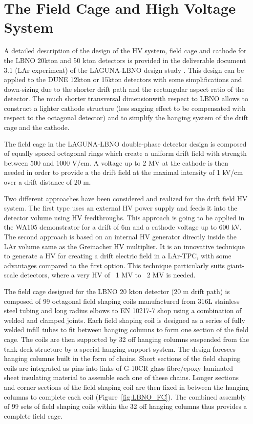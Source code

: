 \section{The Field Cage and High Voltage System} 
\label{sec:detectors-fd-alt-hv}

A detailed description of the design of the HV system, field cage and cathode for the LBNO 20kton and 50 kton detectors is provided in the deliverable document 3.1 (LAr experiment) of the LAGUNA-LBNO design study \cite{LAGUNA-LBNO-deliv}. This design can be applied to the DUNE 12kton or 15kton detectors with some simplifications and down-sizing due to the shorter drift path and the rectangular aspect ratio of the detector. The much shorter transversal dimensionwith respect to LBNO allows to construct a lighter cathode structure (less sagging effect to be compensated with respect to the octagonal detector) and to simplify the hanging system of the drift cage and the cathode.

The field cage in the LAGUNA-LBNO double-phase detector design  is composed of equally spaced octagonal rings which create a uniform drift field with strength between 500 and 1000 V/cm. A  voltage up to 2 MV at the cathode is then needed in order to provide a the drift field at the maximal intensity of 1 kV/cm over a drift distance of 20 m.

Two different approaches have been considered and realized for the drift field HV system. The first type uses an external HV power supply and feeds it into the detector volume using HV feedthroughs. This approach is going to be applied in the WA105 demonstrator for a drift of 6m and a cathode voltage up to 600 kV.  The second approach is based on an internal HV generator directly inside the LAr volume same as the Greinacher HV multiplier. It is an innovative technique to generate a HV for creating a drift electric field in a LAr-TPC, with some advantages compared to the first option. This technique particularly suits giant-scale detectors, where a very HV of ~1 MV to ~2 MV is needed.

The field cage designed for the LBNO 20 kton detector (20 m drift path) is composed of 99 octagonal field shaping coils manufactured from 316L stainless steel tubing and long radius elbows to EN 10217-7 shop using a combination of welded and clamped joints. Each field shaping coil is designed as a series of fully welded infill tubes to fit between hanging columns to form one section of the field cage. The coils are then supported by 32 off hanging columns suspended from the tank deck structure by a special hanging support system. The design foresees hanging columns built in the form of chains. Short sections of the field shaping coils are integrated as pins into links of G-10CR glass fibre/epoxy laminated sheet insulating material to assemble each one of these chains. Longer sections and corner sections of the field shaping coil are then fixed in between the hanging columns to complete each coil (Figure~\ref{fig:LBNO_FC}). The combined assembly of 99 sets of field shaping coils within the 32 off hanging columns thus provides a complete field cage.

